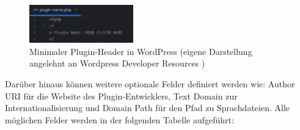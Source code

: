 \begin{figure}[H]
    \centering
    \includegraphics[width=0.4\textwidth]{images/wp_plugin_min}
    \caption{Minimaler Plugin-Header in WordPress (eigene Darstellung angelehnt an Wordpress Developer Resources \cite{wordpress2024HeaderRequirement})}
    \label{fig:wp-plugin-min}
\end{figure}

Darüber hinaus können weitere optionale Felder definiert werden wie:
Author URI für die Website des Plugin-Entwicklers, Text Domain
zur Internationalisierung und Domain Path für den Pfad zu Sprachdateien.
Alle möglichen Felder werden in der folgenden Tabelle aufgeführt:
\renewcommand{\arraystretch}{1.3}

